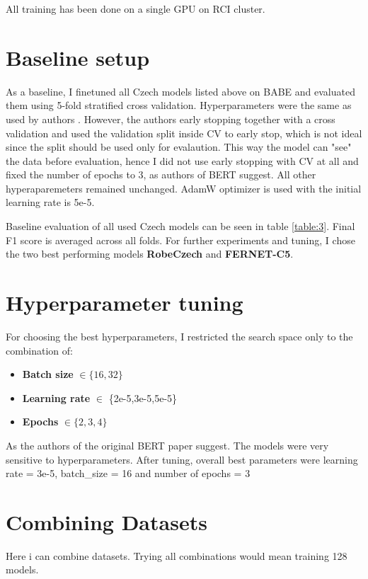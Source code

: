  
 
 
 
All training has been done on a single GPU on RCI cluster.
 \section{Baseline setup}
 As a baseline, I finetuned all Czech models listed above on BABE and evaluated them using 5-fold stratified cross validation. Hyperparameters were the same as used by authors \cite{Spinde2021MBIC}. However, the authors early stopping together with a cross validation and used the validation split inside CV to early stop, which is not ideal since the split should be used only for evalaution. This way the model can "see" the data before evaluation, hence I did not use early stopping with CV at all and fixed the number of epochs to 3, as authors of BERT \cite{devlin2019bert} suggest. 
 All other hyperaparemeters remained unchanged. AdamW optimizer is used with the initial learning rate is 5e-5. 
 
 Baseline evaluation of all used Czech models can be seen in table \ref{table:3}. Final F1 score is averaged across all folds. For further experiments and tuning, I chose the two best performing models \textbf{RobeCzech} and \textbf{FERNET-C5}.
 
 
 
 
 \section{Hyperparameter tuning}
For choosing the best hyperparameters, I restricted the search space only to the combination of:
 \begin{itemize}
     \item \textbf{Batch size} $\in \{16,32\}$
     \item \textbf{Learning rate} $\in $ \{2e-5,3e-5,5e-5\}
     \item \textbf{Epochs} $\in \{2,3,4\}$
 \end{itemize}
 
 As the authors of the original BERT paper suggest. The models were very sensitive to hyperparameters. After tuning, overall best parameters were learning rate = 3e-5, batch\_size = 16 and number of epochs = 3  
 
  

 
 
 \section{Combining Datasets}
 Here i can combine datasets. Trying all combinations would mean training 128 models.

